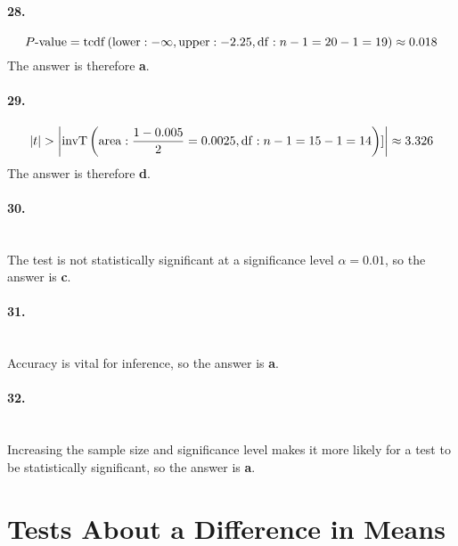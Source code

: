 \documentclass[../Homework]{subfiles}
\begin{document}
		\paragraph{28.}
			\[P\text{-value} = \operatorname{tcdf}\left(\operatorname{lower}: -\infty, \operatorname{upper}: -2.25, \operatorname{df}: n - 1 = 20 - 1 = 19\right) \approx 0.018\]
			The answer is therefore \textbf{a}.
		\paragraph{29.}
			\[|t| > \left|\operatorname{invT}\left(\operatorname{area}: \frac{1 - 0.005}{2} = 0.0025, \operatorname{df}: n - 1 = 15 - 1 = 14\right)]\right| \approx 3.326\]
			The answer is therefore \textbf{d}.
		\paragraph{30.}\ \\
			The test is not statistically significant at a significance level $\alpha = 0.01$, so the answer is \textbf{c}.
		\paragraph{31.}\ \\
			Accuracy is vital for inference, so the answer is \textbf{a}.
		\paragraph{32.}\ \\
			Increasing the sample size and significance level makes it more likely for a test to be statistically significant, so the answer is \textbf{a}.
	\section{Tests About a Difference in Means}
\end{document}
